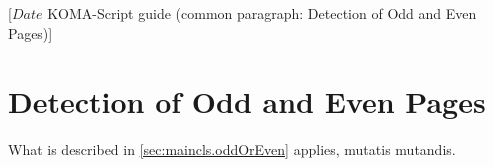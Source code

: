 %
%
%
%
%
%
%
%
% 
%
%
%
%

                 [$Date$
                  KOMA-Script guide (common paragraph: Detection of Odd and
                                     Even Pages)]


\makeatletter
{}%
%
%
%
\makeatother


\section{Detection of Odd and Even Pages}
%
\ifshortversion\IgnoreThisfalse{}\fi%
\ifIgnoreThis %
What is described in
\autoref{sec:maincls.oddOrEven} applies, mutatis mutandis.
\else %
%
%

